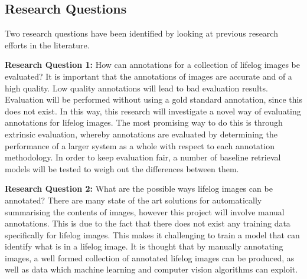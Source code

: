 \subsection{Research Questions}

Two research questions have been identified by looking at previous research efforts in the literature. 

\textbf{Research Question 1:} How can annotations for a collection of lifelog images be evaluated? It is important that the annotations of images are accurate and of a high quality. Low quality annotations will lead to bad evaluation results. Evaluation will be performed without using a gold standard annotation, since this does not exist. In this way, this research will investigate a novel way of evaluating annotations for lifelog images. The most promising way to do this is through extrinsic evaluation, whereby annotations are evaluated by determining the performance of a larger system as a whole with respect to each annotation methodology. In order to keep evaluation fair, a number of baseline retrieval models will be tested to weigh out the differences between them.

\textbf{Research Question 2:} What are the possible ways lifelog images can be annotated? There are many state of the art solutions for automatically summarising the contents of images, however this project will involve manual annotations. This is due to the fact that there does not exist any training data specifically for lifelog images. This makes it challenging to train a model that can identify what is in a lifelog image. It is thought that by manually annotating images, a well formed collection of annotated lifelog images can be produced, as well as data which machine learning and computer vision algorithms can exploit.
